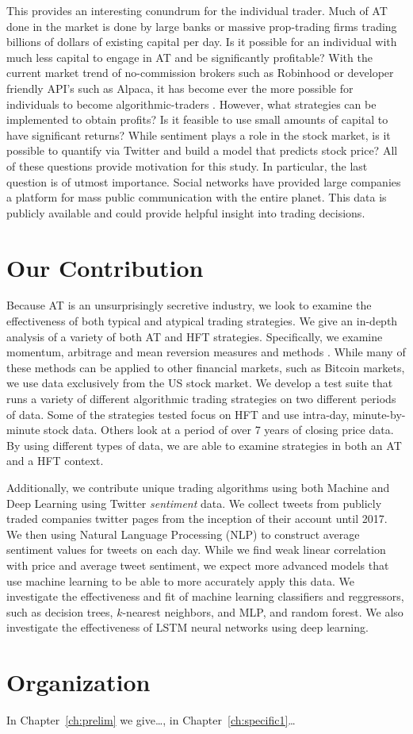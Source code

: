 \documentclass[../thesis.tex]{subfiles}
\begin{document}
This provides an interesting conundrum for the individual trader. Much of AT done in the market is done by large banks or massive prop-trading firms trading billions of dollars of existing capital per day. Is it possible for an individual with much less capital to engage in AT and be significantly profitable? With the current market trend of no-commission brokers such as Robinhood or developer friendly API's such as Alpaca, it has become ever the more possible for individuals to become algorithmic-traders \cite{Alpaca}. However, what strategies can be implemented to obtain profits? Is it feasible to use small amounts of capital to have significant returns? While sentiment plays a role in the stock market, is it possible to quantify via Twitter and build a model that predicts stock price? All of these questions provide motivation for this study. In particular, the last question is of utmost importance. Social networks have provided large companies a platform for mass public communication with the entire planet. This data is publicly available and could provide helpful insight into trading decisions. 


\section{Our Contribution}
Because AT is an unsurprisingly secretive industry, we look to examine the effectiveness of both typical and atypical trading strategies. We give an in-depth analysis of a variety of both AT and HFT strategies. Specifically, we examine momentum, arbitrage and mean reversion measures and methods \cite{Aldridge2010}. While many of these methods can be applied to other financial markets, such as Bitcoin markets, we use data exclusively from the US stock market. We develop a test suite that runs a variety of different algorithmic trading strategies on two different periods of data. Some of the strategies tested focus on HFT and use intra-day, minute-by-minute stock data. Others look at a period of over 7 years of closing price data. By using different types of data, we are able to examine strategies in both an AT and a HFT context. 

Additionally, we contribute unique trading algorithms using both Machine and Deep Learning using Twitter \textit{sentiment} data. We collect tweets from publicly traded companies twitter pages from the inception of their account until 2017. We then using Natural Language Processing (NLP) to construct average sentiment values for tweets on each day. While we find weak linear correlation with price and average tweet sentiment, we expect more advanced models that use machine learning to be able to more accurately apply this data. We investigate the effectiveness and fit of machine learning classifiers and reggressors, such as decision trees, $k$-nearest neighbors, and MLP, and random forest. We also investigate the effectiveness of LSTM neural networks using deep learning. 

\section{Organization}
In Chapter~\ref{ch:prelim} we give\ldots, in Chapter~\ref{ch:specific1}\ldots

\end{document}
